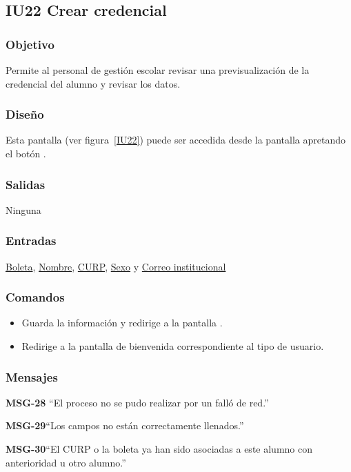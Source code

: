 
\subsection{IU22 Crear credencial}

\subsubsection{Objetivo}
   Permite al personal de gestión escolar revisar una previsualización de la credencial del alumno y revisar los datos.
\subsubsection{Diseño}
    Esta pantalla  (ver figura~\ref{IU22}) puede ser accedida desde la pantalla  apretando el botón .


\subsubsection{Salidas}
Ninguna
\subsubsection{Entradas}
    \hyperlink{Alumno.Boleta}{Boleta}, \hyperlink{Alumno.Nombre}{Nombre}, \hyperlink{Alumno.CURP}{CURP}, \hyperlink{Alumno.Sexo}{Sexo} y \hyperlink{Alumno.Correo institucional}{Correo institucional}
\subsubsection{Comandos}
\begin{itemize}
\item {} Guarda la información y redirige a la pantalla .
    \item {} Redirige a la pantalla de bienvenida correspondiente al tipo de usuario.
    
\end{itemize}

\subsubsection{Mensajes}

\begin{Citemize}
    \item {\bf MSG-28}  ``El proceso no se pudo realizar por un falló de red.''
    \item {\bf MSG-29}{``Los campos no están correctamente llenados.''}
    \item {\bf MSG-30}{``El CURP o la boleta ya han sido asociadas a este alumno con anterioridad u otro alumno.''}
\end{Citemize}
